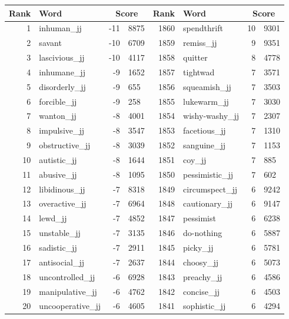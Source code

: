 \begin{table}[tbp]
    \begin{tabular}{| rlr@{.}l | rlr@{.}l |}
    \hline
    \textbf{Rank} & \textbf{Word} & \multicolumn{2}{c|}{\textbf{Score}} & \textbf{Rank} & \textbf{Word} & \multicolumn{2}{c|}{\textbf{Score}} \\
    \hline
    1 & inhuman\_jj & -11 & 8875    &    1860 & spendthrift & 10 & 9301 \\
    2 & savant & -10 & 6709    &    1859 & remiss\_jj & 9 & 9351 \\
    3 & lascivious\_jj & -10 & 4117    &    1858 & quitter & 8 & 4778 \\
    4 & inhumane\_jj & -9 & 1652    &    1857 & tightwad & 7 & 3571 \\
    5 & disorderly\_jj & -9 & 655    &    1856 & squeamish\_jj & 7 & 3503 \\
    6 & forcible\_jj & -9 & 258    &    1855 & lukewarm\_jj & 7 & 3030 \\
    7 & wanton\_jj & -8 & 4001    &    1854 & wishy-washy\_jj & 7 & 2307 \\
    8 & impulsive\_jj & -8 & 3547    &    1853 & facetious\_jj & 7 & 1310 \\
    9 & obstructive\_jj & -8 & 3039    &    1852 & sanguine\_jj & 7 & 1153 \\
    10 & autistic\_jj & -8 & 1644    &    1851 & coy\_jj & 7 & 885 \\
    11 & abusive\_jj & -8 & 1095    &    1850 & pessimistic\_jj & 7 & 602 \\
    12 & libidinous\_jj & -7 & 8318    &    1849 & circumspect\_jj & 6 & 9242 \\
    13 & overactive\_jj & -7 & 6964    &    1848 & cautionary\_jj & 6 & 9147 \\
    14 & lewd\_jj & -7 & 4852    &    1847 & pessimist & 6 & 6238 \\
    15 & unstable\_jj & -7 & 3135    &    1846 & do-nothing & 6 & 5887 \\
    16 & sadistic\_jj & -7 & 2911    &    1845 & picky\_jj & 6 & 5781 \\
    17 & antisocial\_jj & -7 & 2637    &    1844 & choosy\_jj & 6 & 5073 \\
    18 & uncontrolled\_jj & -6 & 6928    &    1843 & preachy\_jj & 6 & 4586 \\
    19 & manipulative\_jj & -6 & 4762    &    1842 & concise\_jj & 6 & 4503 \\
    20 & uncooperative\_jj & -6 & 4605    &    1841 & sophistic\_jj & 6 & 4294 \\

\end{tabular}
\end{table}
